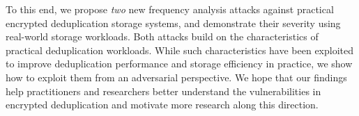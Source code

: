 \documentclass[bachelor]{thesis-uestc}
\begin{document}
To this end, we propose {\em two} new frequency analysis attacks against
practical encrypted deduplication storage systems, and demonstrate their
severity using real-world storage workloads.  Both attacks build on the
characteristics of practical deduplication workloads.  While such
characteristics have been exploited to improve deduplication performance and
storage efficiency in practice, we show how to exploit them from an
adversarial perspective.  We hope that our findings help practitioners and
researchers better understand the vulnerabilities in encrypted deduplication
and motivate more research along this direction.   




\end{document}
